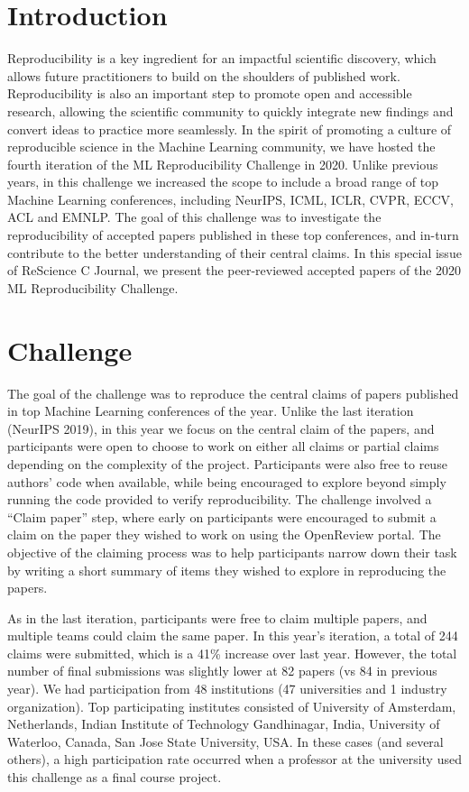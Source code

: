 

\section{Introduction}

Reproducibility is a key ingredient for an impactful scientific discovery, which allows future practitioners to build on the shoulders of published work. Reproducibility is also an important step to promote open and accessible research, allowing the scientific community to quickly integrate new findings and convert ideas to practice more seamlessly. In the spirit of promoting a culture of reproducible science in the Machine Learning community, we have hosted the fourth iteration of the ML Reproducibility Challenge in 2020. Unlike previous years, in this challenge we increased the scope to include a broad range of top Machine Learning conferences, including NeurIPS, ICML, ICLR, CVPR, ECCV, ACL and EMNLP. The goal of this challenge was to investigate the reproducibility of accepted papers published in these top conferences, and in-turn contribute to the better understanding of their central claims. In this special issue of ReScience C Journal, we present the peer-reviewed accepted papers of the 2020 ML Reproducibility Challenge.

\section{Challenge}

The goal of the challenge was to reproduce the central claims of papers published in top Machine Learning conferences of the year. Unlike the last iteration (NeurIPS 2019), in this year we focus on the central claim of the papers, and participants were open to choose to work on either all claims or partial claims depending on the complexity of the project. Participants were also free to reuse authors’ code when available, while being encouraged to explore beyond simply running the code provided to verify reproducibility. The challenge involved a “Claim paper” step, where early on  participants  were encouraged to submit a claim on the paper they wished to work on using the OpenReview portal. The objective of the claiming process was to help participants  narrow down their task by writing a short summary of items they wished to explore in reproducing the papers.

As in the last iteration, participants were free to claim multiple papers, and multiple teams could claim the same paper. In this year’s iteration, a total of 244 claims were submitted, which is a 41\% increase over last year. However, the total number of final submissions was slightly lower at 82 papers (vs 84 in previous year). We had participation from 48 institutions (47 universities and 1 industry organization). Top participating institutes consisted of University of Amsterdam, Netherlands, Indian Institute of Technology Gandhinagar, India, University of Waterloo, Canada, San Jose State University, USA. In these cases (and several others), a high participation rate occurred when a professor at the university used this challenge as a final course project.

